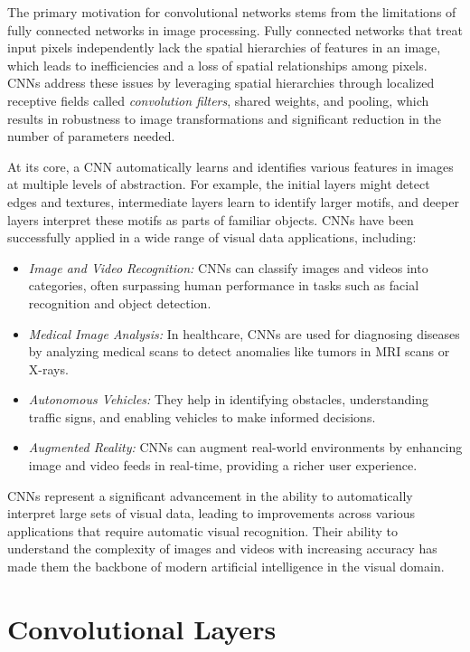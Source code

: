 The primary motivation for convolutional networks stems from the limitations of fully connected networks in image processing. Fully connected networks that treat input pixels independently lack the spatial hierarchies of features in an image, which leads to inefficiencies and a loss of spatial relationships among pixels. CNNs address these issues by leveraging spatial hierarchies through localized receptive fields called \emph{convolution filters}, shared weights, and pooling, which results in robustness to image transformations and significant reduction in the number of parameters needed.

At its core, a CNN automatically learns and identifies various features in images at multiple levels of abstraction. For example, the initial layers might detect edges and textures, intermediate layers learn to identify larger motifs, and deeper layers interpret these motifs as parts of familiar objects. CNNs have been successfully applied in a wide range of visual data applications, including:

\begin{itemize}
\item \emph{Image and Video Recognition:} CNNs can classify images and videos into categories, often surpassing human performance in tasks such as facial recognition and object detection.
\item \emph{Medical Image Analysis:} In healthcare, CNNs are used for diagnosing diseases by analyzing medical scans to detect anomalies like tumors in MRI scans or X-rays.
\item \emph{Autonomous Vehicles:} They help in identifying obstacles, understanding traffic signs, and enabling vehicles to make informed decisions.
\item \emph{Augmented Reality:} CNNs can augment real-world environments by enhancing image and video feeds in real-time, providing a richer user experience.
\end{itemize}

CNNs represent a significant advancement in the ability to automatically interpret large sets of visual data, leading to improvements across various applications that require automatic visual recognition. Their ability to understand the complexity of images and videos with increasing accuracy has made them the backbone of modern artificial intelligence in the visual domain.

\section{Convolutional Layers}

